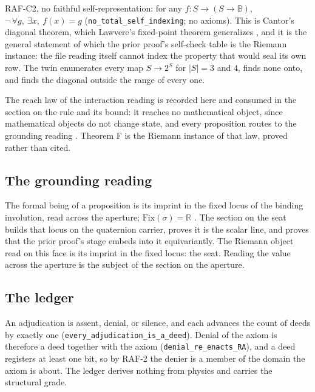 \documentclass[10pt,twocolumn]{article}
\begin{document}
RAF-C2, no faithful self-representation: for any
\(f : S \to (S \to \mathbb{B})\),
\(\neg\,\forall g,\ \exists x,\ f(x) = g\)
(\texttt{no\_\allowbreak total\_\allowbreak self\_\allowbreak indexing};
no axioms). This is Cantor's diagonal theorem, which Lawvere's
fixed-point theorem generalizes \cite{lawvere1969}, and it is the
general statement of which the prior proof's self-check table is the
Riemann instance: the file reading itself cannot index the property that
would seal its own row. The twin enumerates every map \(S \to 2^S\) for
\(|S| = 3\) and \(4\), finds none onto, and finds the diagonal outside
the range of every one.

The reach law of the interaction reading is recorded here and consumed
in the section on the rule and its bound: it reaches no mathematical
object, since mathematical objects do not change state, and every
proposition routes to the grounding reading \cite{islamraf, islamfae}.
Theorem F is the Riemann instance of that law, proved rather than cited.

\hypertarget{the-grounding-reading}{%
\subsection{The grounding reading}\label{the-grounding-reading}}

The formal being of a proposition is its imprint in the fixed locus of
the binding involution, read across the aperture;
\(\mathrm{Fix}(\sigma) = \mathbb{R}\) \cite{islamraf}. The section on
the seat builds that locus on the quaternion carrier, proves it is the
scalar line, and proves that the prior proof's stage embeds into it
equivariantly. The Riemann object read on this face is its imprint in
the fixed locus: the seat. Reading the value across the aperture is the
subject of the section on the aperture.

\hypertarget{the-ledger}{%
\subsection{The ledger}\label{the-ledger}}

An adjudication is assent, denial, or silence, and each advances the
count of deeds by exactly one
(\texttt{every\_\allowbreak adjudication\_\allowbreak is\_\allowbreak a\_\allowbreak deed}).
Denial of the axiom is therefore a deed together with the axiom
(\texttt{denial\_\allowbreak re\_\allowbreak enacts\_\allowbreak RA}),
and a deed registers at least one bit, so by RAF-2 the denier is a
member of the domain the axiom is about. The ledger derives nothing from
physics and carries the structural grade.
\end{document}
